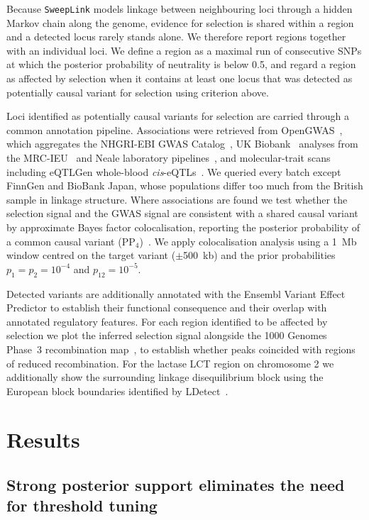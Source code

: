 \documentclass{article}
\newcommand{\SweepLink}{\texttt{SweepLink}\xspace}
\begin{document}
Because \SweepLink models linkage between neighbouring loci through a hidden Markov chain along the genome, evidence for selection is shared within a region and a detected locus rarely stands alone.
We therefore report regions together with an individual loci.
We define a region as a maximal run of consecutive SNPs at which the posterior probability of neutrality is below 0.5, and regard a region as affected by selection when it contains at least one locus that was detected as potentially causal variant for selection using criterion above.

Loci identified as potentially causal variants for selection are carried through a common annotation pipeline.
Associations were retrieved from OpenGWAS~\citep{elsworth2020}, which aggregates the NHGRI-EBI GWAS Catalog~\citep{buniello2019}, UK Biobank~\citep{bycroft2018} analyses from the MRC-IEU~\citep{elsworth2019ukb} and Neale laboratory pipelines~\citep{nealelab2018ukb}, and molecular-trait scans including eQTLGen whole-blood \emph{cis}-eQTLs~\citep{vosa2021}.
We queried every batch except FinnGen and BioBank Japan, whose populations differ too much from the British sample in linkage structure.
Where associations are found we test whether the selection signal and the GWAS signal are consistent with a shared causal variant by approximate Bayes factor colocalisation, reporting the posterior probability of a common causal variant (PP$_4$)~\citep{giambartolomei2014}.
We apply colocalisation analysis using a 1~Mb window centred on the target variant ($\pm$500~kb) and the prior probabilities $p_1 = p_2 = 10^{-4}$ and $p_{12} = 10^{-5}$.

Detected variants are additionally annotated with the Ensembl Variant Effect Predictor \citep{mclaren2016} to establish their functional consequence and their overlap with annotated regulatory features.
For each region identified to be affected by selection we plot the inferred selection signal alongside the 1000 Genomes Phase~3 recombination map~\citep{1000G2015,howie2009}, to establish whether peaks coincided with regions of reduced recombination.
For the lactase LCT region on chromosome 2 we additionally show the surrounding linkage disequilibrium block using the European block boundaries identified by LDetect~\citet{berisa2015}.

\section{Results}

\subsection{Strong posterior support eliminates the need for threshold tuning}
\label{sec:threshold}
\end{document}
